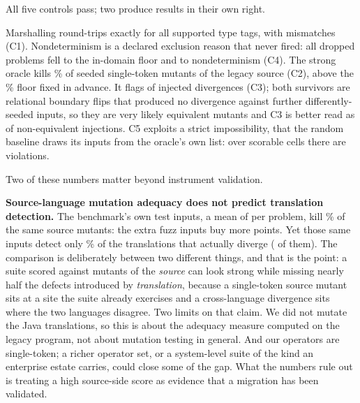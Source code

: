 \documentclass[sigconf]{acmart}
\begin{document}
All five controls pass; two produce results in their own right.

Marshalling round-trips exactly for all \ConeTags{} supported type tags, with \ConeMismatch{}
mismatches (C1). Nondeterminism is a declared exclusion reason that never fired: all
\CfourDropped{} dropped problems fell to the in-domain floor and \CfourNondet{} to
nondeterminism (C4). The strong oracle kills \CtwoKill\% of \CtwoMutants{} seeded
single-token mutants of the legacy source (C2), above the \MutantFloor\% floor fixed in advance.
It flags \CthreeCaught{} of \CthreeN{} injected divergences (C3); both survivors are relational
boundary flips that produced no divergence against \CthreeExtraInputs{} further
differently-seeded inputs, so they are very likely equivalent mutants and C3 is better read as
\CthreeCaught{} of \CthreeCaught{} non-equivalent injections. C5 exploits a strict
impossibility, that the random baseline draws its inputs from the oracle's own list: over
\CfiveChecked{} scorable cells there are \CfiveViolations{} violations.

Two of these numbers matter beyond instrument validation.

\textbf{Source-language mutation adequacy does not predict translation detection.} The
benchmark's own test inputs, a mean of \BenchInputsMean{} per problem, kill \CtwoBenchKill\% of
the same source mutants: the extra \NFuzz{} fuzz inputs buy \CtwoGapPP{} more points. Yet those
same inputs detect only \BenchDetect\% of the \BenchDivergent{} translations that actually
diverge (\BenchDetected{} of them). The comparison is deliberately between two different things,
and that is the point: a suite scored against mutants of the \emph{source} can look strong while
missing nearly half the defects introduced by \emph{translation}, because a single-token source
mutant sits
at a site the suite already exercises and a cross-language divergence sits where the two
languages disagree. Two limits on that claim. We did not mutate the Java translations, so this is
about the adequacy measure computed on the legacy program, not about mutation testing in general.
And our operators are single-token; a richer operator set, or a system-level suite of the kind an
enterprise estate carries, could close some of the gap. What the numbers rule out is treating a
high source-side score as evidence that a migration has been validated.
\end{document}
